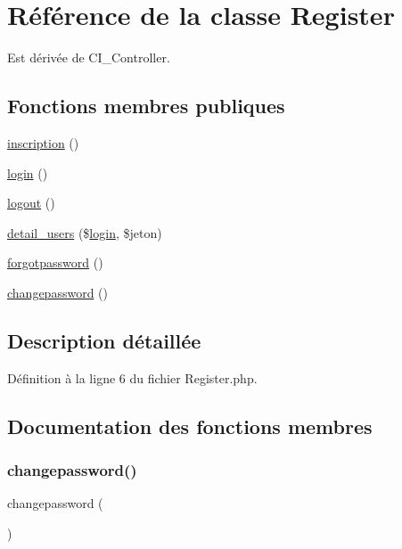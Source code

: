 \hypertarget{class_register}{}\section{Référence de la classe Register}
\label{class_register}


Est dérivée de C\+I\+\_\+\+Controller.

\subsection*{Fonctions membres publiques}
\begin{DoxyCompactItemize}
\item 
\mbox{\hyperlink{class_register_a4557a98375bdb947deb544e20403b81a}{inscription}} ()
\item 
\mbox{\hyperlink{class_register_aa311da27ba5706f5710cea7706c8eae1}{login}} ()
\item 
\mbox{\hyperlink{class_register_a082405d89acd6835c3a7c7a08a7adbab}{logout}} ()
\item 
\mbox{\hyperlink{class_register_a312b3f7f729d750399310ae8c7b8c7de}{detail\+\_\+users}} (\$\mbox{\hyperlink{class_register_aa311da27ba5706f5710cea7706c8eae1}{login}}, \$jeton)
\item 
\mbox{\hyperlink{class_register_a29c35afa0b38a581afe73649e5ab755f}{forgotpassword}} ()
\item 
\mbox{\hyperlink{class_register_a6dd7aa562858078537ef81daea645072}{changepassword}} ()
\end{DoxyCompactItemize}


\subsection{Description détaillée}


Définition à la ligne 6 du fichier Register.\+php.



\subsection{Documentation des fonctions membres}
\mbox{\label{class_register_a6dd7aa562858078537ef81daea645072}} 
\subsubsection{\texorpdfstring{changepassword()}{changepassword()}}
{\footnotesize\ttfamily changepassword (\begin{DoxyParamCaption}{ }\end{DoxyParamCaption})}



